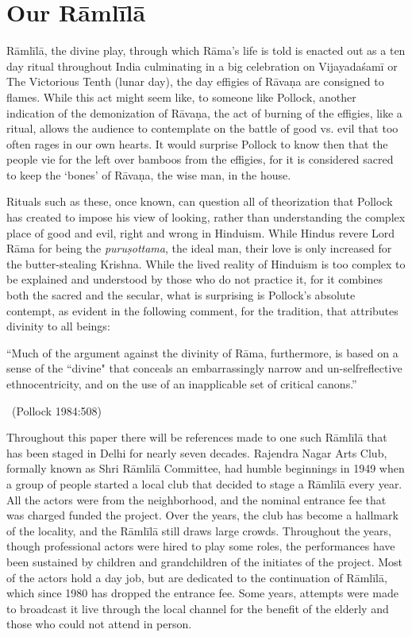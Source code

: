 \section*{Our Rāmlīlā}

Rāmlīlā, the divine play, through which Rāma’s life is told is enacted out as a ten day ritual throughout India culminating in a big celebration on Vijayadaśamī or The Victorious Tenth (lunar day), the day effigies of Rāvaṇa are consigned to flames. While this act might seem like, to someone like Pollock, another indication of the demonization of Rāvaṇa, the act of burning of the effigies, like a ritual, allows the audience to contemplate on the battle of good vs. evil that too often rages in our own hearts. It would surprise Pollock to know then that the people vie for the left over bamboos from the effigies, for it is considered sacred to keep the ‘bones’ of Rāvaṇa, the wise man, in the house.

Rituals such as these, once known, can question all of theorization that Pollock has created to impose his view of looking, rather than understanding the complex place of good and evil, right and wrong in Hinduism. While Hindus revere Lord Rāma for being the \textit{puruṣottama}, the ideal man, their love is only increased for the butter-stealing Krishna. While the lived reality of Hinduism is too complex to be explained and understood by those who do not practice it, for it combines both the sacred and the secular, what is surprising is Pollock’s absolute contempt, as evident in the following comment, for the tradition, that attributes divinity to all beings:

\begin{myquote}
“Much of the argument against the divinity of Rāma, furthermore, is based on a sense of the “divine" that conceals an embarrassingly narrow and un-selfreflective ethnocentricity, and on the use of an inapplicable set of critical canons.”

\vskip -5pt

~\hfill (Pollock 1984:508)
\end{myquote}

Throughout this paper there will be references made to one such Rāmlīlā that has been staged in Delhi for nearly seven decades. Rajendra Nagar Arts Club, formally known as Shri Rāmlīlā Committee, had humble beginnings in 1949 when a group of people started a local club that decided to stage a Rāmlīlā every year. All the actors were from the neighborhood, and the nominal entrance fee that was charged funded the project. Over the years, the club has become a hallmark of the locality, and the Rāmlīlā still draws large crowds. Throughout the years, though professional actors were hired to play some roles, the performances have been sustained by children and grandchildren of the initiates of the project. Most of the actors hold a day job, but are dedicated to the continuation of Rāmlīlā, which since 1980 has dropped the entrance fee. Some years, attempts were made to broadcast it live through the local channel for the benefit of the elderly and those who could not attend in person.

